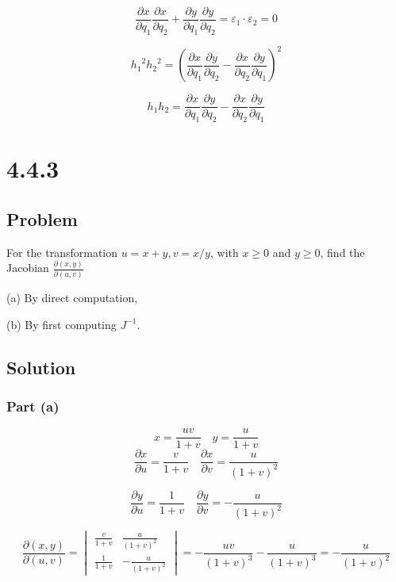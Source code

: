 \documentclass[12pt]{article}
\begin{document}
\[
    \frac{\partial x}{\partial q_{1}} \frac{\partial x}{\partial q_{2}}+\frac{\partial y}{\partial q_{1}} \frac{\partial y}{\partial q_{2}}
    = \varepsilon_1 \cdot \varepsilon_2 = 0
\]

\[
    {h_1}^2{h_2}^2 = {\left(\frac{\partial x}{\partial q_{1}} \frac{\partial y}{\partial q_{2}}-\frac{\partial x}{\partial q_{2}} \frac{\partial y}{\partial q_{1}}\right) }^2
\]

\[
    h_1h_2 = \frac{\partial x}{\partial q_{1}} \frac{\partial y}{\partial q_{2}}-\frac{\partial x}{\partial q_{2}} \frac{\partial y}{\partial q_{1}}
\]

\newpage
\section{4.4.3}

\subsection{Problem}

For the transformation \(u=x+y, v=x / y\), with \(x \geq 0\) and \(y \geq 0\), find the Jacobian \(\frac{\partial(x, y)}{\partial(u, v)}\)

(a) By direct computation,

(b) By first computing \(J^{-1}\).

\subsection{Solution}

\subsubsection{Part (a)}

\[
    x = \frac{uv}{1 + v} \quad y = \frac{u}{1 + v}
\]
\[
    \frac{\partial x}{\partial u} = \frac{v}{1 + v} \quad \frac{\partial x}{\partial v} = \frac{u}{{(1 + v)}^2}
\]

\[
    \frac{\partial y}{\partial u} = \frac{1}{1 + v} \quad \frac{\partial y}{\partial v} = -\frac{u}{{(1 + v)}^2}
\]

\[
    \frac{\partial(x, y)}{\partial(u, v)} = \begin{vmatrix}
        \frac{v}{1 + v} & \frac{u}{{(1 + v)}^2}  \\
        \frac{1}{1 + v} & -\frac{u}{{(1 + v)}^2}
    \end{vmatrix} = - \frac{uv}{{(1 + v)}^3} - \frac{u}{{(1 + v)}^3} = -\frac{u}{{(1 + v)}^2}
\]
\end{document}
